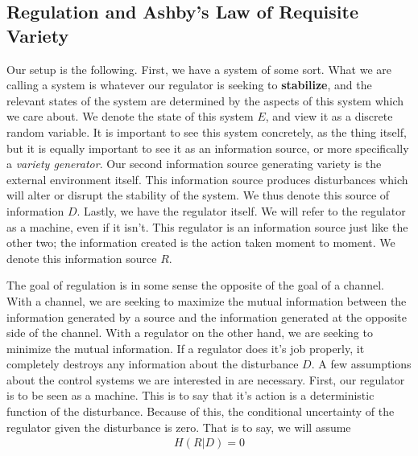 \subsection{Regulation and Ashby's Law of Requisite Variety}
	Our setup is the following. First, we have a system of some sort.  
What we are calling a system is whatever our regulator is seeking to \textbf{stabilize}, and the relevant states of the system are determined by the aspects of this system which we care about. We denote the state of this system $E$, and view it as a discrete random variable. It is important to see this system concretely, as the thing itself, but it is equally important to see it as an information source, or more specifically a \emph{variety generator}. Our second information source generating variety is the external environment itself. This information source produces disturbances which will alter or disrupt the stability of the system. We thus denote this source of information $D$. Lastly, we have the regulator itself. We will refer to the regulator as a machine, even if it isn't. This regulator is an information source just like the other two; the information created is the action taken moment to moment. We denote this information source $R$. \par 
	The goal of regulation is in some sense the opposite of the goal of a channel. With a channel, we are seeking to maximize the mutual information between the information generated by a source and the information generated at the opposite side of the channel. With a regulator on the other hand, we are seeking to minimize the mutual information. If a regulator does it's job properly, it completely destroys any information about the disturbance $D$. A few assumptions about the control systems we are interested in are necessary. First, our regulator is to be seen as a machine. This is to say that it's action is a deterministic function of the disturbance. Because of this, the conditional uncertainty of the regulator given the disturbance is zero. That is to say, we will assume
	\begin{align}
		H(R|D) = 0
	\end{align}
